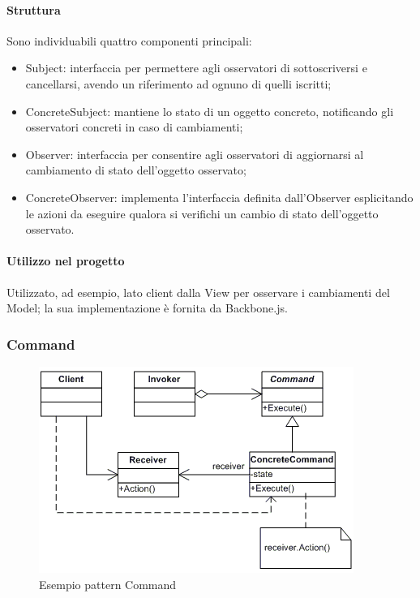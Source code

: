 \documentclass[../PianoDiQualifica.tex]{subfiles}
\begin{document}
				\paragraph{Struttura\\}
					Sono individuabili quattro componenti principali:
					\begin{itemize}
						\item Subject: interfaccia per permettere agli osservatori di sottoscriversi e
						cancellarsi, avendo un riferimento ad ognuno di quelli iscritti;
						\item ConcreteSubject: mantiene lo stato di un oggetto concreto, notificando
						gli osservatori concreti in caso di cambiamenti;
						\item Observer: interfaccia per consentire agli osservatori di aggiornarsi al
						cambiamento di stato dell'oggetto osservato;
						\item ConcreteObserver: implementa l'interfaccia definita dall'Observer
						esplicitando le azioni da eseguire qualora si verifichi un cambio di stato
						dell'oggetto osservato.
					\end{itemize}
				\paragraph{Utilizzo nel progetto\\}
					Utilizzato, ad esempio, lato client dalla View per osservare i cambiamenti del
					Model; la sua implementazione è fornita da Backbone.js.
			\subsubsection{Command}
				\begin{figure}[H] \label{fig:Command}
					\centering
					\includegraphics[scale=0.8]{Immagini/CommandEx.png}
					\caption{Esempio pattern Command}
				\end{figure}
\end{document}
